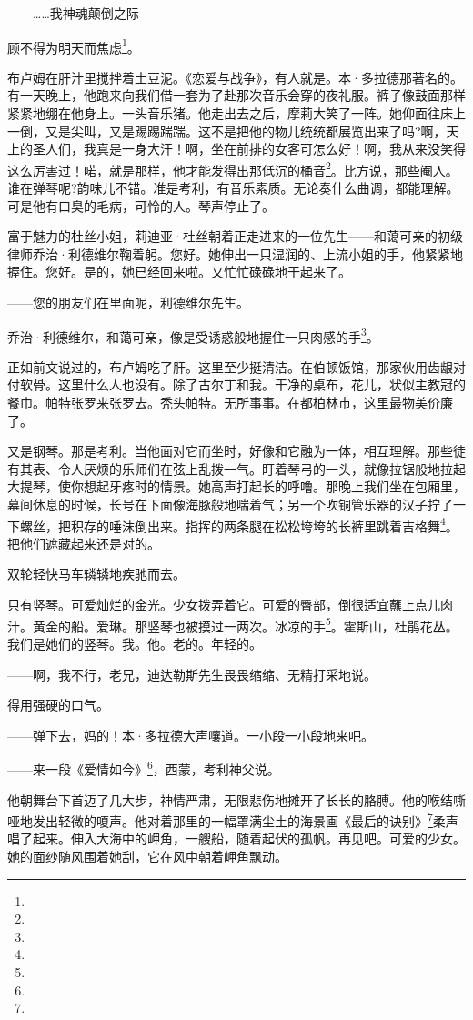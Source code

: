 \par ——……我神魂颠倒之际
\par 顾不得为明天而焦虑\footnote{}。
\par 布卢姆在肝汁里搅拌着土豆泥。《恋爱与战争》，有人就是。本·多拉德那著名的。有一天晚上，他跑来向我们借一套为了赴那次音乐会穿的夜礼服。裤子像鼓面那样紧紧地绷在他身上。一头音乐猪。他走出去之后，摩莉大笑了一阵。她仰面往床上一倒，又是尖叫，又是踢踢踹踹。这不是把他的物儿统统都展览出来了吗?啊，天上的圣人们，我真是一身大汗！啊，坐在前排的女客可怎么好！啊，我从来没笑得这么厉害过！喏，就是那样，他才能发得出那低沉的桶音\footnote{}。比方说，那些阉人。谁在弹琴呢?韵味儿不错。准是考利，有音乐素质。无论奏什么曲调，都能理解。可是他有口臭的毛病，可怜的人。琴声停止了。
\par 富于魅力的杜丝小姐，莉迪亚·杜丝朝着正走进来的一位先生——和蔼可亲的初级律师乔治·利德维尔鞠着躬。您好。她伸出一只湿润的、上流小姐的手，他紧紧地握住。您好。是的，她已经回来啦。又忙忙碌碌地干起来了。
\par ——您的朋友们在里面呢，利德维尔先生。
\par 乔治·利德维尔，和蔼可亲，像是受诱惑般地握住一只肉感的手\footnote{}。
\par 正如前文说过的，布卢姆吃了肝。这里至少挺清洁。在伯顿饭馆，那家伙用齿龈对付软骨。这里什么人也没有。除了古尔丁和我。干净的桌布，花儿，状似主教冠的餐巾。帕特张罗来张罗去。秃头帕特。无所事事。在都柏林市，这里最物美价廉了。
\par 又是钢琴。那是考利。当他面对它而坐时，好像和它融为一体，相互理解。那些徒有其表、令人厌烦的乐师们在弦上乱拨一气。盯着琴弓的一头，就像拉锯般地拉起大提琴，使你想起牙疼时的情景。她高声打起长的呼噜。那晚上我们坐在包厢里，幕间休息的时候，长号在下面像海豚般地喘着气；另一个吹铜管乐器的汉子拧了一下螺丝，把积存的唾沫倒出来。指挥的两条腿在松松垮垮的长裤里跳着吉格舞\footnote{}。把他们遮藏起来还是对的。
\par 双轮轻快马车辚辚地疾驰而去。
\par 只有竖琴。可爱灿烂的金光。少女拨弄着它。可爱的臀部，倒很适宜蘸上点儿肉汁。黄金的船。爱琳。那竖琴也被摸过一两次。冰凉的手\footnote{}。霍斯山，杜鹃花丛。我们是她们的竖琴。我。他。老的。年轻的。
\par ——啊，我不行，老兄，迪达勒斯先生畏畏缩缩、无精打采地说。
\par 得用强硬的口气。
\par ——弹下去，妈的！本·多拉德大声嚷道。一小段一小段地来吧。
\par ——来一段《爱情如今》\footnote{}，西蒙，考利神父说。
\par 他朝舞台下首迈了几大步，神情严肃，无限悲伤地摊开了长长的胳膊。他的喉结嘶哑地发出轻微的嗄声。他对着那里的一幅罩满尘土的海景画《最后的诀别》\footnote{}柔声唱了起来。伸入大海中的岬角，一艘船，随着起伏的孤帆。再见吧。可爱的少女。她的面纱随风围着她刮，它在风中朝着岬角飘动。
